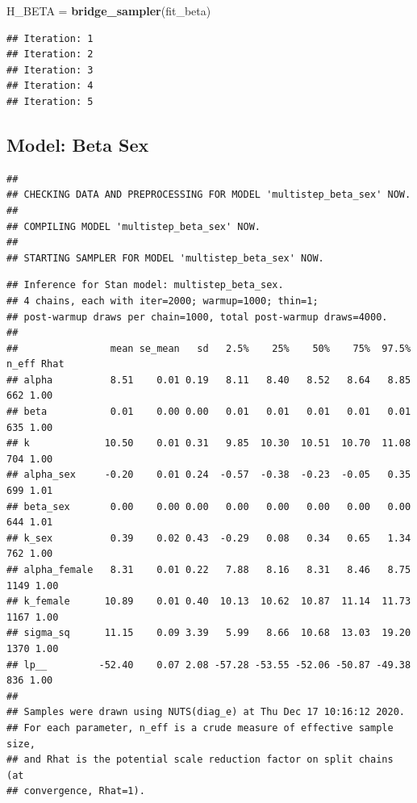 \documentclass[
]{article}
\newenvironment{Shaded}{\begin{snugshade}}{\end{snugshade}}
\newcommand{\KeywordTok}[1]{\textcolor[rgb]{0.13,0.29,0.53}{\textbf{#1}}}
\newcommand{\NormalTok}[1]{#1}
\newcommand{\StringTok}[1]{\textcolor[rgb]{0.31,0.60,0.02}{#1}}
\begin{document}
\begin{Shaded}
\begin{Highlighting}[]
\NormalTok{H_BETA =}\StringTok{ }\KeywordTok{bridge_sampler}\NormalTok{(fit_beta)}
\end{Highlighting}
\end{Shaded}

\begin{verbatim}
## Iteration: 1
## Iteration: 2
## Iteration: 3
## Iteration: 4
## Iteration: 5
\end{verbatim}

\hypertarget{model-beta-sex}{%
\subsection{Model: Beta Sex}\label{model-beta-sex}}

\begin{verbatim}
## 
## CHECKING DATA AND PREPROCESSING FOR MODEL 'multistep_beta_sex' NOW.
## 
## COMPILING MODEL 'multistep_beta_sex' NOW.
## 
## STARTING SAMPLER FOR MODEL 'multistep_beta_sex' NOW.
\end{verbatim}

\begin{verbatim}
## Inference for Stan model: multistep_beta_sex.
## 4 chains, each with iter=2000; warmup=1000; thin=1; 
## post-warmup draws per chain=1000, total post-warmup draws=4000.
## 
##                mean se_mean   sd   2.5%    25%    50%    75%  97.5% n_eff Rhat
## alpha          8.51    0.01 0.19   8.11   8.40   8.52   8.64   8.85   662 1.00
## beta           0.01    0.00 0.00   0.01   0.01   0.01   0.01   0.01   635 1.00
## k             10.50    0.01 0.31   9.85  10.30  10.51  10.70  11.08   704 1.00
## alpha_sex     -0.20    0.01 0.24  -0.57  -0.38  -0.23  -0.05   0.35   699 1.01
## beta_sex       0.00    0.00 0.00   0.00   0.00   0.00   0.00   0.00   644 1.01
## k_sex          0.39    0.02 0.43  -0.29   0.08   0.34   0.65   1.34   762 1.00
## alpha_female   8.31    0.01 0.22   7.88   8.16   8.31   8.46   8.75  1149 1.00
## k_female      10.89    0.01 0.40  10.13  10.62  10.87  11.14  11.73  1167 1.00
## sigma_sq      11.15    0.09 3.39   5.99   8.66  10.68  13.03  19.20  1370 1.00
## lp__         -52.40    0.07 2.08 -57.28 -53.55 -52.06 -50.87 -49.38   836 1.00
## 
## Samples were drawn using NUTS(diag_e) at Thu Dec 17 10:16:12 2020.
## For each parameter, n_eff is a crude measure of effective sample size,
## and Rhat is the potential scale reduction factor on split chains (at 
## convergence, Rhat=1).
\end{verbatim}
\end{document}
